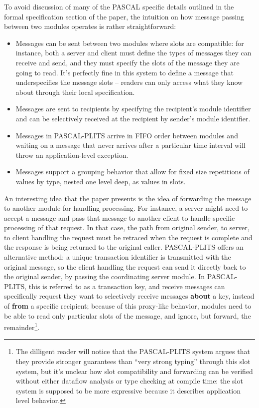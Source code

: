To avoid discussion of many of the PASCAL specific details outlined in the formal specification section of the paper, the intuition on how message passing between two modules operates is rather straightforward:
\begin{itemize}
\item Messages can be sent between two modules where slots are compatible: for instance, both a server and client must define the types of messages they can receive and send, and they must specify the slots of the message they are going to read.  It's perfectly fine in this system to define a message that underspecifies the message slots -- readers can only access what they know about through their local specification.
\item Messages are sent to recipients by specifying the recipient's module identifier and can be selectively received at the recipient by sender's module identifier.
\item Messages in PASCAL-PLITS arrive in FIFO order between modules and waiting on a message that never arrives after a particular time interval will throw an application-level exception.
\item Messages support a grouping behavior that allow for fixed size repetitions of values by type, nested one level deep, as values in slots.
\end{itemize}

An interesting idea that the paper presents is the idea of forwarding the message to another module for handling processing.  For instance, a server might need to accept a message and pass that message to another client to handle specific processing of that request.  In that case, the path from original sender, to server, to client handling the request must be retraced when the request is complete and the response is being returned to the original caller.  PASCAL-PLITS offers an alternative method: a unique transaction identifier is transmitted with the original message, so the client handling the request can send it directly back to the original sender, by passing the coordinating server module.  In PASCAL-PLITS, this is referred to as a transaction key, and receive messages can specifically request they want to selectively receive messages \textbf{about} a key, instead of \textbf{from} a specific recipient; because of this proxy-like behavior, modules need to be able to read only particular slots of the message, and ignore, but forward, the remainder\footnote{The dilligent reader will notice that the PASCAL-PLITS system argues that they provide stronger guarantees than ``very strong typing'' through this slot system, but it's unclear how slot compatibility and forwarding can be verified without either dataflow analysis or type checking at compile time: the slot system is supposed to be more expressive because it describes application level behavior.}.

